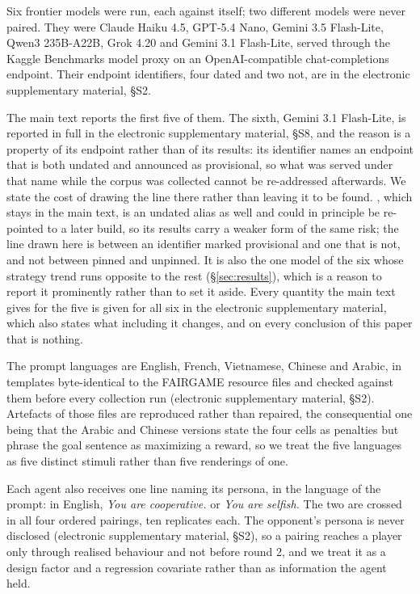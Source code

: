\documentclass[11pt,a4paper]{article}
\begin{document}
Six frontier models were run, each against itself; two different models were
never paired. They were Claude Haiku 4.5, GPT-5.4 Nano, Gemini 3.5 Flash-Lite,
Qwen3 235B-A22B, Grok 4.20 and Gemini 3.1 Flash-Lite, served through the Kaggle
Benchmarks model proxy on an OpenAI-compatible chat-completions endpoint. Their
endpoint identifiers, four dated and two not, are in the electronic
supplementary material, \S S2.

The main text reports the first five of them. The sixth, Gemini 3.1 Flash-Lite,
is reported in full in the electronic supplementary material, \S S8, and the
reason is a property of its endpoint rather than of its results: its identifier
names an endpoint that is both undated and announced as provisional, so what was
served under that name while the corpus was collected cannot be re-addressed
afterwards. We state the cost of drawing the line there rather than leaving it
to be found. , which stays in the main text, is an
undated alias as well and could in principle be re-pointed to a later build, so
its results carry a weaker form of the same risk; the line drawn here is between
an identifier marked provisional and one that is not, and not between pinned and
unpinned. It is also the one model of the six whose strategy trend
runs opposite to the rest (\S\ref{sec:results}), which is a reason to report it
prominently rather than to set it aside. Every quantity the main text gives for
the five is given for all six in the electronic supplementary material, which
also states what including it changes, and on every conclusion of this paper
that is nothing.

The prompt languages are English, French, Vietnamese, Chinese and Arabic, in
templates byte-identical to the FAIRGAME resource files and checked against them
before every collection run (electronic supplementary material, \S S2).
Artefacts of those files are reproduced rather than repaired, the consequential
one being that the Arabic and Chinese versions state the four cells as penalties
but phrase the goal sentence as maximizing a reward, so we treat the five
languages as five distinct stimuli rather than five renderings of one.

Each agent also receives one line naming its persona, in the language of the
prompt: in English, \emph{You are cooperative.} or \emph{You are selfish.} The
two are crossed in all four ordered pairings, ten replicates each. The
opponent's persona is never disclosed (electronic supplementary material,
\S S2), so a pairing reaches a player only through realised behaviour and not
before round 2, and we treat it as a design factor and a regression covariate
rather than as information the agent held.
\end{document}
